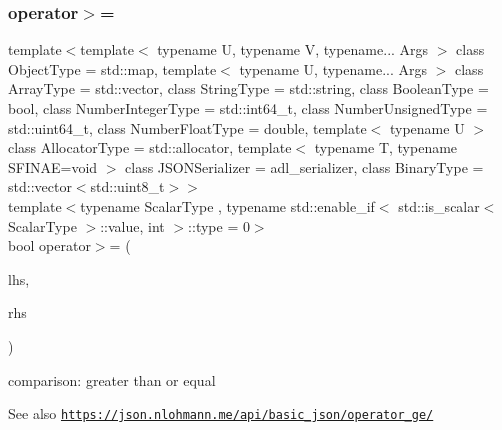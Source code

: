 \subsubsection{\texorpdfstring{operator$>$=}{operator>=}\hspace{0.1cm}{\footnotesize\ttfamily [3/3]}}
{\footnotesize\ttfamily template$<$template$<$ typename U, typename V, typename... Args $>$ class Object\+Type = std\+::map, template$<$ typename U, typename... Args $>$ class Array\+Type = std\+::vector, class String\+Type  = std\+::string, class Boolean\+Type  = bool, class Number\+Integer\+Type  = std\+::int64\+\_\+t, class Number\+Unsigned\+Type  = std\+::uint64\+\_\+t, class Number\+Float\+Type  = double, template$<$ typename U $>$ class Allocator\+Type = std\+::allocator, template$<$ typename T, typename S\+F\+I\+N\+A\+E=void $>$ class J\+S\+O\+N\+Serializer = adl\+\_\+serializer, class Binary\+Type  = std\+::vector$<$std\+::uint8\+\_\+t$>$$>$ \\
template$<$typename Scalar\+Type , typename std\+::enable\+\_\+if$<$ std\+::is\+\_\+scalar$<$ Scalar\+Type $>$\+::value, int $>$\+::type  = 0$>$ \\
bool operator$>$= (\begin{DoxyParamCaption}\item[{Scalar\+Type}]{lhs,  }\item[{\hyperlink{classnlohmann_1_1basic__json_ab8a1c33ee7b154fc41ca2545aa9724e6}{const\+\_\+reference}}]{rhs }\end{DoxyParamCaption})\hspace{0.3cm}{\ttfamily [friend]}}



comparison\+: greater than or equal 

\begin{DoxySeeAlso}{See also}
\href{https://json.nlohmann.me/api/basic_json/operator_ge/}{\tt https\+://json.\+nlohmann.\+me/api/basic\+\_\+json/operator\+\_\+ge/} 
\end{DoxySeeAlso}
\mbox{\label{classnlohmann_1_1basic__json_a34d6a60dd99e9f33b8273a1c8db5669b}} 
